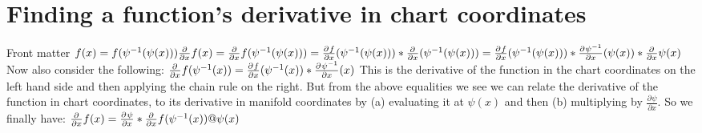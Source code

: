 \documentclass[18pt]{extarticle}
\newcommand*{\pd}[3][]{\ensuremath{\frac{\partial^{#1} #2}{\partial #3}}}
\begin{document}
\section{Finding a function's derivative in chart coordinates}
Front matter
$
\\ f(x) = f(\psi^{-1}(\psi(x)))
%
\\ \frac{\partial}{\partial x} f(x) =
\frac{\partial }{\partial x} 
f(\psi^{-1}(\psi(x)))
%
\\ =\pd{f}{x}(\psi^{-1}(\psi(x))) *
\pd{}{x}(\psi^{-1}(\psi(x))) 
%
\\ =\pd{f}{x}(\psi^{-1}(\psi(x))) *
\pd{\psi^{-1}}{x}(\psi(x)) *
\pd{}{x}\psi(x)
\\ $
\newline
Now also consider the following:
\newline
$
\\ \pd{}{x}f(\psi^{-1}(x)) =
\pd{f}{x}(\psi^{-1}(x)) *
\pd{\psi^{-1}}{x}(x)
$
\newline
\newline
This is the derivative of the function in the chart coordinates on the left hand side and then applying the chain rule on the right.
\newline 
But from the above equalities we see we can relate
the derivative of the function in chart coordinates, to its derivative in manifold coordinates by (a) evaluating it at $\psi(x)$ and then (b) multiplying by $\pd{\psi}{x}$.
\newline 
\newline
So we finally have:
\newline
$
\\ \pd{}{x}f(x) = \pd{\psi}{x} * 
\pd{}{x}f(\psi^{-1}(x)) @ \psi(x)
$
\end{document}
